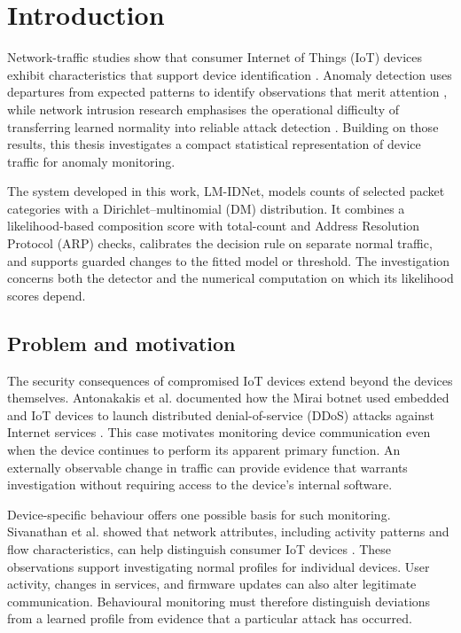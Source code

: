 \chapter{Introduction}
\label{ch:introduction}

Network-traffic studies show that consumer Internet of Things (IoT) devices
exhibit characteristics that support device identification
\cite{sivanathan2019}. Anomaly detection uses departures from expected
patterns to identify observations that merit attention \cite{chandola2009},
while network intrusion research emphasises the operational difficulty of
transferring learned normality into reliable attack detection
\cite{sommer2010}. Building on those results, this thesis investigates a
compact statistical representation of device traffic for anomaly monitoring.

The system developed in this work, LM-IDNet, models counts of selected packet
categories with a Dirichlet--multinomial (DM) distribution. It combines a
likelihood-based composition score with total-count and Address Resolution
Protocol (ARP) checks, calibrates the decision rule on separate normal
traffic, and supports guarded changes to the fitted model or threshold.
The investigation concerns both the detector and the numerical computation
on which its likelihood scores depend.

\section{Problem and motivation}

The security consequences of compromised IoT devices extend beyond the
devices themselves. Antonakakis et al. documented how the Mirai botnet used
embedded and IoT devices to launch distributed denial-of-service (DDoS) attacks
against Internet services \cite{antonakakis2017}. This case motivates
monitoring device communication even when the device continues to perform
its apparent primary function. An externally observable change in traffic
can provide evidence that warrants investigation without requiring access
to the device's internal software.

Device-specific behaviour offers one possible basis for such monitoring.
Sivanathan et al. showed that network attributes, including activity
patterns and flow characteristics, can help distinguish consumer IoT
devices \cite{sivanathan2019}. These observations support investigating
normal profiles for individual devices. User activity, changes in services,
and firmware updates can also alter legitimate communication. Behavioural
monitoring must therefore
distinguish deviations from a learned profile from evidence that a
particular attack has occurred.

